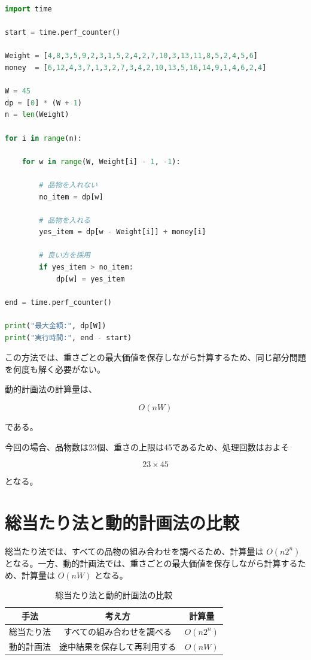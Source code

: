 \documentclass[dvipdfmx,a4paper,11pt]{jsarticle}
\begin{document}
\begin{lstlisting}[language=Python, caption=動的計画法による実装]
import time

start = time.perf_counter()

Weight = [4,8,3,5,9,2,3,1,5,2,4,2,7,10,3,13,11,8,5,2,4,5,6]
money  = [6,12,4,3,7,1,3,2,7,3,4,2,10,13,5,16,14,9,1,4,6,2,4]

W = 45
dp = [0] * (W + 1)
n = len(Weight)

for i in range(n):

    for w in range(W, Weight[i] - 1, -1):

        # 品物を入れない
        no_item = dp[w]

        # 品物を入れる
        yes_item = dp[w - Weight[i]] + money[i]

        # 良い方を採用
        if yes_item > no_item:
            dp[w] = yes_item

end = time.perf_counter()

print("最大金額:", dp[W])
print("実行時間:", end - start)
\end{lstlisting}

この方法では、重さごとの最大価値を保存しながら計算するため、同じ部分問題を何度も解く必要がない。

動的計画法の計算量は、

\[
O(nW)
\]

である。

今回の場合、品物数は23個、重さの上限は45であるため、処理回数はおよそ

\[
23 \times 45
\]

となる。

\section{総当たり法と動的計画法の比較}

総当たり法では、すべての品物の組み合わせを調べるため、計算量は $O(n2^n)$ となる。一方、動的計画法では、重さごとの最大価値を保存しながら計算するため、計算量は $O(nW)$ となる。

\begin{table}[H]
\centering
\caption{総当たり法と動的計画法の比較}
\begin{tabular}{|c|c|c|}
\hline
手法 & 考え方 & 計算量 \\ \hline
総当たり法 & すべての組み合わせを調べる & $O(n2^n)$ \\ \hline
動的計画法 & 途中結果を保存して再利用する & $O(nW)$ \\ \hline
\end{tabular}
\label{tab:comparison}
\end{table}
\end{document}
